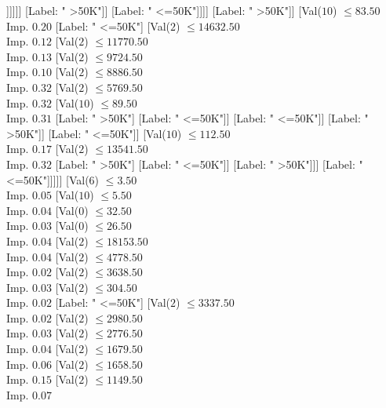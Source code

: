 \documentclass[margin=10pt]{standalone}
\begin{document}
\begin{forest}
													[Label: " >50K"]
													[Val($2$) $ \leq 16633.50$ \\ Imp. $1.00$
														[Label: " <=50K"]
														[Label: " >50K"]]]]]]
									[Label: " >50K"]]
								[Label: " <=50K"]]]]
					[Label: " >50K"]]
				[Val($10$) $ \leq 83.50$ \\ Imp. $0.20$
					[Label: " <=50K"]
					[Val($2$) $ \leq 14632.50$ \\ Imp. $0.12$
						[Val($2$) $ \leq 11770.50$ \\ Imp. $0.13$
							[Val($2$) $ \leq 9724.50$ \\ Imp. $0.10$
								[Val($2$) $ \leq 8886.50$ \\ Imp. $0.32$
									[Val($2$) $ \leq 5769.50$ \\ Imp. $0.32$
										[Val($10$) $ \leq 89.50$ \\ Imp. $0.31$
											[Label: " >50K"]
											[Label: " <=50K"]]
										[Label: " <=50K"]]
									[Label: " >50K"]]
								[Label: " <=50K"]]
							[Val($10$) $ \leq 112.50$ \\ Imp. $0.17$
								[Val($2$) $ \leq 13541.50$ \\ Imp. $0.32$
									[Label: " >50K"]
									[Label: " <=50K"]]
								[Label: " >50K"]]]
						[Label: " <=50K"]]]]]
		[Val($6$) $ \leq 3.50$ \\ Imp. $0.05$
			[Val($10$) $ \leq 5.50$ \\ Imp. $0.04$
				[Val($0$) $ \leq 32.50$ \\ Imp. $0.03$
					[Val($0$) $ \leq 26.50$ \\ Imp. $0.04$
						[Val($2$) $ \leq 18153.50$ \\ Imp. $0.04$
							[Val($2$) $ \leq 4778.50$ \\ Imp. $0.02$
								[Val($2$) $ \leq 3638.50$ \\ Imp. $0.03$
									[Val($2$) $ \leq 304.50$ \\ Imp. $0.02$
										[Label: " <=50K"]
										[Val($2$) $ \leq 3337.50$ \\ Imp. $0.02$
											[Val($2$) $ \leq 2980.50$ \\ Imp. $0.03$
												[Val($2$) $ \leq 2776.50$ \\ Imp. $0.04$
													[Val($2$) $ \leq 1679.50$ \\ Imp. $0.06$
														[Val($2$) $ \leq 1658.50$ \\ Imp. $0.15$
															[Val($2$) $ \leq 1149.50$ \\ Imp. $0.07$

\end{forest}
\end{document}
